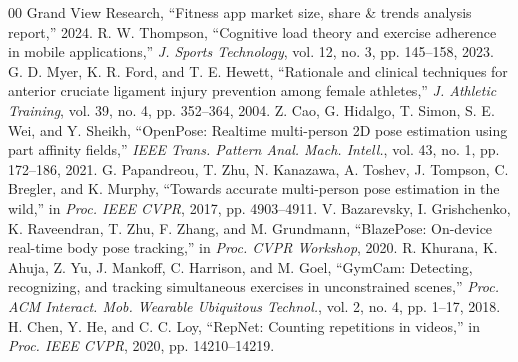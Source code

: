 \documentclass[conference]{IEEEtran}
\begin{document}
\begin{thebibliography}{00}
 Grand View Research, ``Fitness app market size, share \& trends analysis report,'' 2024.
 R. W. Thompson, ``Cognitive load theory and exercise adherence in mobile applications,'' \textit{J. Sports Technology}, vol. 12, no. 3, pp. 145--158, 2023.
 G. D. Myer, K. R. Ford, and T. E. Hewett, ``Rationale and clinical techniques for anterior cruciate ligament injury prevention among female athletes,'' \textit{J. Athletic Training}, vol. 39, no. 4, pp. 352--364, 2004.
 Z. Cao, G. Hidalgo, T. Simon, S. E. Wei, and Y. Sheikh, ``OpenPose: Realtime multi-person 2D pose estimation using part affinity fields,'' \textit{IEEE Trans. Pattern Anal. Mach. Intell.}, vol. 43, no. 1, pp. 172--186, 2021.
 G. Papandreou, T. Zhu, N. Kanazawa, A. Toshev, J. Tompson, C. Bregler, and K. Murphy, ``Towards accurate multi-person pose estimation in the wild,'' in \textit{Proc. IEEE CVPR}, 2017, pp. 4903--4911.
 V. Bazarevsky, I. Grishchenko, K. Raveendran, T. Zhu, F. Zhang, and M. Grundmann, ``BlazePose: On-device real-time body pose tracking,'' in \textit{Proc. CVPR Workshop}, 2020.
 R. Khurana, K. Ahuja, Z. Yu, J. Mankoff, C. Harrison, and M. Goel, ``GymCam: Detecting, recognizing, and tracking simultaneous exercises in unconstrained scenes,'' \textit{Proc. ACM Interact. Mob. Wearable Ubiquitous Technol.}, vol. 2, no. 4, pp. 1--17, 2018.
 H. Chen, Y. He, and C. C. Loy, ``RepNet: Counting repetitions in videos,'' in \textit{Proc. IEEE CVPR}, 2020, pp. 14210--14219.
\end{thebibliography}
\end{document}
